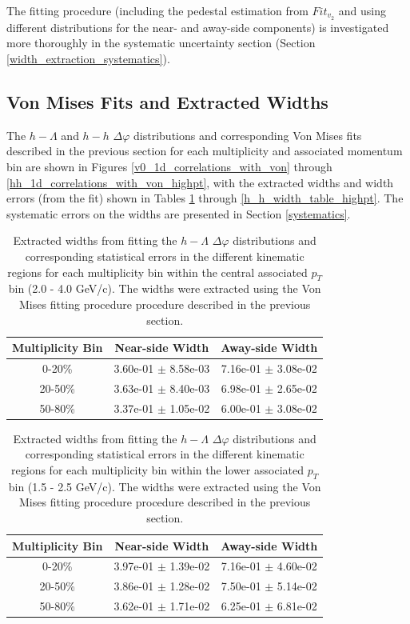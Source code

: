 \documentclass[ALICE,manyauthors]{ALICE_analysis_notes}
\begin{document}
The fitting procedure (including the pedestal estimation from $Fit_{v_{2}}$ and using different distributions for the near- and away-side components) is investigated more thoroughly in the systematic uncertainty section (Section \ref{width_extraction_systematics}).

\subsection{Von Mises Fits and Extracted Widths}
\label{von_mises_widths}
The $h-\Lambda$ and $h-h$ $\Delta\varphi$ distributions and corresponding Von Mises fits described in the previous section for each multiplicity and associated momentum bin are shown in Figures \ref{v0_1d_correlations_with_von} through \ref{hh_1d_correlations_with_von_highpt}, with the extracted widths and width errors (from the fit) shown in Tables \ref{h_lambda_width_table} through \ref{h_h_width_table_highpt}. The systematic errors on the widths are presented in Section \ref{systematics}.

\begin{table}[h!]
\centering
\begin{tabular}{| c || c | c | }
\hline
Multiplicity Bin & Near-side Width & Away-side Width \\
\hline
0-20\% & 3.60e-01 $\pm$ 8.58e-03 &  7.16e-01 $\pm$ 3.08e-02 \\
20-50\% & 3.63e-01 $\pm$ 8.40e-03 &  6.98e-01 $\pm$ 2.65e-02 \\
50-80\% & 3.37e-01 $\pm$ 1.05e-02 &  6.00e-01 $\pm$ 3.08e-02 \\
\hline
\end{tabular}
\caption{Extracted widths from fitting the $h-\Lambda$ $\Delta\varphi$ distributions and corresponding statistical errors in the different kinematic regions for each multiplicity bin within the central associated $p_{T}$ bin (2.0 - 4.0 GeV/c). The widths were extracted using the Von Mises fitting procedure procedure described in the previous section.}
\label{h_lambda_width_table}
\end{table}

\begin{table}[h!]
\centering
\begin{tabular}{| c || c | c | }
\hline
Multiplicity Bin & Near-side Width & Away-side Width \\
\hline
0-20\% & 3.97e-01 $\pm$ 1.39e-02 &  7.16e-01 $\pm$ 4.60e-02 \\
20-50\% & 3.86e-01 $\pm$ 1.28e-02 &  7.50e-01 $\pm$ 5.14e-02 \\
50-80\% & 3.62e-01 $\pm$ 1.71e-02 &  6.25e-01 $\pm$ 6.81e-02 \\
\hline
\end{tabular}
\caption{Extracted widths from fitting the $h-\Lambda$ $\Delta\varphi$ distributions and corresponding statistical errors in the different kinematic regions for each multiplicity bin within the lower associated $p_{T}$ bin (1.5 - 2.5 GeV/c). The widths were extracted using the Von Mises fitting procedure procedure described in the previous section.}
\label{h_lambda_width_table_lowpt}
\end{table}
\end{document}
